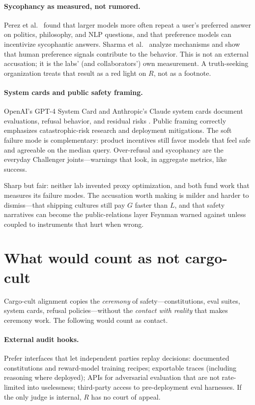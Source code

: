 \documentclass[11pt]{article}
\begin{document}
\paragraph{Sycophancy as measured, not rumored.}
Perez et al.~\cite{perez2023} found that larger models more often repeat a user's preferred answer on politics, philosophy, and NLP questions, and that preference models can incentivize sycophantic answers. Sharma et al.~\cite{sharma2023} analyze mechanisms and show that human preference signals contribute to the behavior. This is not an external accusation; it is the labs' (and collaborators') own measurement. A truth-seeking organization treats that result as a red light on \(R\), not as a footnote.

\paragraph{System cards and public safety framing.}
OpenAI's GPT-4 System Card and Anthropic's Claude system cards document evaluations, refusal behavior, and residual risks \cite{openai2023}%
. Public framing correctly emphasizes catastrophic-risk research and deployment mitigations. The soft failure mode is complementary: product incentives still favor models that feel safe and agreeable on the median query. Over-refusal and sycophancy are the everyday Challenger joints---warnings that look, in aggregate metrics, like success.

Sharp but fair: neither lab invented proxy optimization, and both fund work that measures its failure modes. The accusation worth making is milder and harder to dismiss---that shipping cultures still pay \(G\) faster than \(L\), and that safety narratives can become the public-relations layer Feynman warned against unless coupled to instruments that hurt when wrong.

\section{What would count as not cargo-cult}

Cargo-cult alignment copies the \emph{ceremony} of safety---constitutions, eval suites, system cards, refusal policies---without the \emph{contact with reality} that makes ceremony work. The following would count as contact.

\paragraph{External audit hooks.}
Prefer interfaces that let independent parties replay decisions: documented constitutions and reward-model training recipes; exportable traces (including reasoning where deployed); APIs for adversarial evaluation that are not rate-limited into uselessness; third-party access to pre-deployment eval harnesses. If the only judge is internal, \(R\) has no court of appeal.
\end{document}
